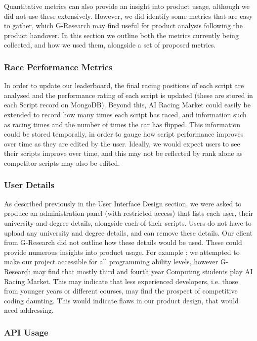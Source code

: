 Quantitative metrics can also provide an insight into product usage, although we did not use these extensively. However, we did identify some metrics that are easy to gather, which G-Research may find useful for product analysis following the product handover. In this section we outline both the metrics currently being collected, and how we used them, alongside a set of proposed metrics. 

\subsubsection{Race Performance Metrics}

In order to update our leaderboard, the final racing positions of each script are analysed and the performance rating of each script is updated (these are stored in each Script record on MongoDB). Beyond this, AI Racing Market could easily be extended to record how many times each script has raced, and information such as racing times and the number of times the car has flipped. This information could be stored temporally, in order to gauge how script performance improves over time as they are edited by the user. Ideally, we would expect users to see their scripts improve over time, and this may not be reflected by rank alone as competitor scripts may also be edited. 

\subsubsection{User Details}

As described previously in the User Interface Design section, we were asked to produce an administration panel (with restricted access) that lists each user, their university and degree details, alongside each of their scripts. Users do not have to upload any university and degree details, and can remove these details. Our client from G-Research did not outline how these details would be used. These could provide numerous insights into product usage. For example : we attempted to make our project accessible for all programming ability levels, however G-Research may find that mostly third and fourth year Computing students play AI Racing Market. This may indicate that less experienced developers, i.e. those from younger years or different courses, may find the prospect of competitive coding daunting. This would indicate flaws in our product design, that would need addressing.

\subsubsection{API Usage}

